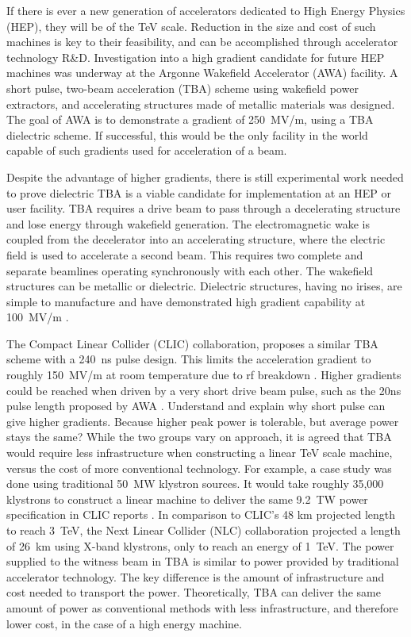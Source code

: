 \documentclass{iitthesis}
\newcommand{\nrnote}[1]{\textsf{{\color{blue}{ NN note:}   #1 }}}
\begin{document}
 \label{sec:motivation}

If there is ever a new generation of accelerators dedicated to High Energy Physics
(HEP), they will be of the TeV scale. Reduction in the size and cost
of such machines is key to their feasibility, and can be accomplished
through accelerator technology R\&D. Investigation into a 
high gradient candidate for future HEP machines was underway
at the Argonne Wakefield Accelerator (AWA) facility. A
short pulse, two-beam acceleration (TBA) scheme using 
wakefield power extractors, and accelerating structures made 
of metallic materials was designed. 
The goal of AWA is to demonstrate a gradient of
\SI{250}{MV/m}, using a TBA dielectric scheme. If successful, this would
be the only facility in the world capable of such gradients used for
acceleration of a beam.

Despite the advantage of higher gradients, there is still experimental work
needed to prove dielectric TBA is a viable candidate for implementation at an HEP or user facility.
TBA requires a drive beam to pass through a decelerating structure and
lose energy through wakefield generation. The electromagnetic wake
is coupled from the decelerator into an accelerating structure, where
the electric field is used to accelerate a second beam. This requires
two complete and separate beamlines operating synchronously with each other.  
The wakefield structures can be metallic or dielectric. Dielectric
structures, having no irises, are simple to manufacture and have demonstrated
high gradient capability at \SI{100}{MV/m} \cite{WeiPaper}. 

The Compact Linear Collider (CLIC) collaboration, proposes a similar TBA scheme with
a \SI{240}{ns} pulse design. This limits the acceleration gradient
to roughly \SI{150}{MV/m} at room temperature due to rf breakdown \cite{CLICdesignReport}.
Higher gradients could be reached when driven by a very short drive
beam pulse, such as the 20ns pulse length proposed by AWA \cite{WeiPaper}. 
\nrnote{Understand and explain why short pulse can give higher gradients. 
Because higher peak power is tolerable, but average power stays the same?}
While the two groups vary on approach, it is agreed that TBA would 
require less infrastructure when constructing a linear TeV scale machine, 
versus the cost of more conventional technology. 
For example, a case study was done using traditional \SI{50}{MW} klystron sources.
It would take roughly 35,000 klystrons to construct a linear machine to deliver the same 
\SI{9.2}{TW} power specification in CLIC reports \cite{CLICdesignReport}. 
In comparison to CLIC's 48 km projected length to reach \SI{3}{TeV}, the Next Linear
Collider (NLC) collaboration projected a length of \SI{26}{km} using X-band klystrons,
only to reach an energy of \SI{1}{TeV}. %
The power supplied to the witness beam in TBA is similar to
power provided by traditional accelerator technology. 
The key difference is the amount of infrastructure and cost 
needed to transport the power. Theoretically, TBA can deliver
the same amount of power as conventional methods with less 
infrastructure, and therefore lower cost, in the case of a high energy machine. 
\end{document}
